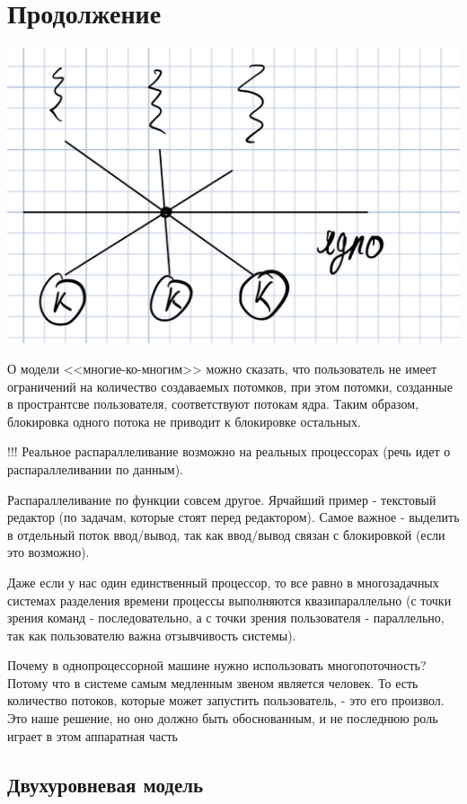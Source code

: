 \documentclass[14pt, a4paper]{article}
\begin{document}
	\section*{Продолжение}
	
	\includegraphics[width=\linewidth]{1}
	
	О модели <<многие-ко-многим>> можно сказать, что пользователь не имеет ограничений на количество создаваемых потомков, при этом потомки, созданные в пространтсве пользователя, соответствуют потокам ядра. Таким образом, блокировка одного потока не приводит к блокировке остальных.
	
	!!! Реальное распараллеливание возможно на реальных процессорах (речь идет о распараллеливании по данным).
	
	Распараллеливание по функции совсем другое. Ярчайший пример - текстовый редактор (по задачам, которые стоят перед редактором). Самое важное - выделить в отдельный поток ввод/вывод, так как ввод/вывод связан с блокировкой (если это возможно).
	
	Даже если у нас один единственный процессор, то все равно в многозадачных системах разделения времени процессы выполняются квазипараллельно (с точки зрения команд - последовательно, а с точки зрения пользователя - параллельно, так как пользователю важна отзывчивость системы).
	
	Почему в однопроцессорной машине нужно использовать многопоточность? Потому что в системе самым медленным звеном является человек. То есть количество потоков, которые может запустить пользователь, - это его произвол. Это наше решение, но оно должно быть обоснованным, и не последнюю роль играет в этом аппаратная часть
	
	\subsection*{Двухуровневая модель}
	
\end{document}

